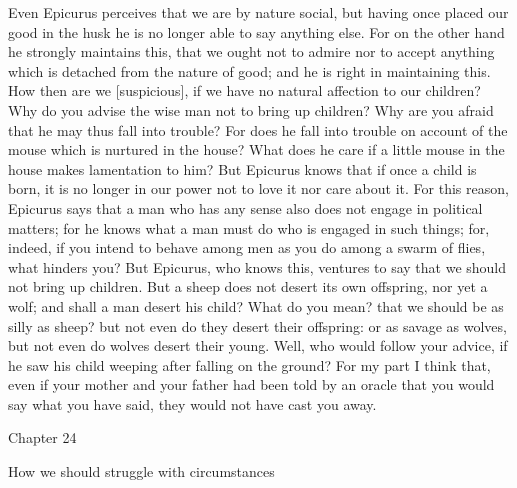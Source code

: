 \documentclass[a4paper]{article}
\begin{document}
    Even Epicurus perceives that we are by nature social, but having once
placed our good in the husk he is no longer able to say anything else. For on
the other hand he strongly maintains this, that we ought not to admire nor to
accept anything which is detached from the nature of good; and he is right in
maintaining this. How then are we [suspicious], if we have no natural affection
to our children? Why do you advise the wise man not to bring up children? Why
are you afraid that he may thus fall into trouble? For does he fall into
trouble on account of the mouse which is nurtured in the house? What does he
care if a little mouse in the house makes lamentation to him? But Epicurus
knows that if once a child is born, it is no longer in our power not to love it
nor care about it. For this reason, Epicurus says that a man who has any sense
also does not engage in political matters; for he knows what a man must do who
is engaged in such things; for, indeed, if you intend to behave among men as
you do among a swarm of flies, what hinders you? But Epicurus, who knows this,
ventures to say that we should not bring up children. But a sheep does not
desert its own offspring, nor yet a wolf; and shall a man desert his child?
What do you mean? that we should be as silly as sheep? but not even do they
desert their offspring: or as savage as wolves, but not even do wolves desert
their young. Well, who would follow your advice, if he saw his child weeping
after falling on the ground? For my part I think that, even if your mother and
your father had been told by an oracle that you would say what you have said,
they would not have cast you away.

Chapter 24

How we should struggle with circumstances
\end{document}
